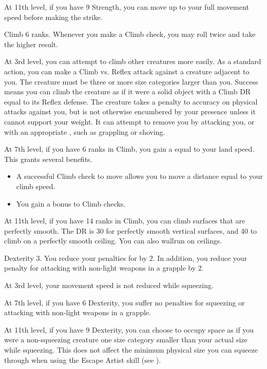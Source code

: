     At 11th level, if you have 9 Strength, you can move up to your full movement speed before making the strike.

    \featpre Climb 6 ranks.
    \featben Whenever you make a Climb check, you may roll twice and take the higher result.

    At 3rd level, you can attempt to climb other creatures more easily.
    As a standard action, you can make a Climb vs. Reflex attack against a creature adjacent to you.
    The creature must be three or more size categories larger than you.
    Success means you can climb the creature as if it were a solid object with a Climb DR equal to its Reflex defense.
    The creature takes a  penalty to accuracy on physical attacks against you, but is not otherwise encumbered by your presence unless it cannot support your weight.
    It can attempt to remove you by attacking you, or with an appropriate , such as grappling or shoving.

    At 7th level, if you have 6 ranks in Climb, you gain a  equal to your land speed.
    This grants several benefits.
    \begin{itemize}
        \item A successful Climb check to move allows you to move a distance equal to your climb speed.
        \item You gain a  bonus to Climb checks.
    \end{itemize}

    At 11th level, if you have 14 ranks in Climb, you can climb surfaces that are perfectly smooth.
    The DR is 30 for perfectly smooth vertical surfaces, and 40 to climb on a perfectly smooth ceiling.
    You can also wallrun on ceilings.

    \featpre Dexterity 3.
    \featben You reduce your penalties for  by 2. In addition, you reduce your penalty for attacking with non-light weapons in a grapple by 2.

    At 3rd level, your movement speed is not reduced while squeezing.

    At 7th level, if you have 6 Dexterity, you suffer no penalties for squeezing or attacking with non-light weapons in a grapple.

    At 11th level, if you have 9 Dexterity, you can choose to occupy space as if you were a non-squeezing creature one size category smaller than your actual size while squeezing.
    This does not affect the minimum physical size you can squeeze through when using the Escape Artist skill (see ).

